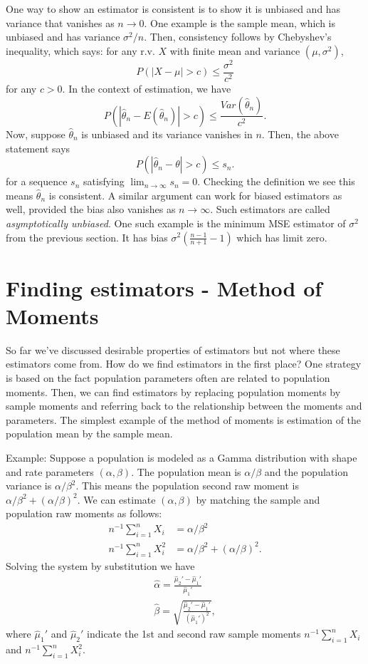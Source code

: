 \documentclass[
]{book}
\begin{document}
One way to show an estimator is consistent is to show it is unbiased and has variance that vanishes as \(n\rightarrow 0\). One example is the sample mean, which is unbiased and has variance \(\sigma^2/n\). Then, consistency follows by Chebyshev's inequality, which says: for any r.v. \(X\) with finite mean and variance \((\mu, \sigma^2)\),
\[P(|X - \mu|>c)\leq \frac{\sigma^2}{c^2}\]
for any \(c>0\). In the context of estimation, we have
\[P(|\hat\theta_n - E(\hat\theta_n)|>c) \leq \frac{Var(\hat\theta_n)}{c^2}.\]
Now, suppose \(\hat\theta_n\) is unbiased and its variance vanishes in \(n\). Then, the above statement says
\[P(|\hat\theta_n - \theta|>c) \leq s_n.\]
for a sequence \(s_n\) satisfying \(\lim_{n\rightarrow \infty} s_n = 0\). Checking the definition we see this means \(\hat\theta_n\) is consistent. A similar argument can work for biased estimators as well, provided the bias also vanishes as \(n\rightarrow\infty\). Such estimators are called \emph{asymptotically unbiased}. One such example is the minimum MSE estimator of \(\sigma^2\) from the previous section. It has bias \(\sigma^2(\frac{n-1}{n+1}-1)\) which has limit zero.

\hypertarget{finding-estimators---method-of-moments}{%
\section{Finding estimators - Method of Moments}\label{finding-estimators---method-of-moments}}

So far we've discussed desirable properties of estimators but not where these estimators come from. How do we find estimators in the first place? One strategy is based on the fact population parameters often are related to population moments. Then, we can find estimators by replacing population moments by sample moments and referring back to the relationship between the moments and parameters. The simplest example of the method of moments is estimation of the population mean by the sample mean.

Example: Suppose a population is modeled as a Gamma distribution with shape and rate parameters \((\alpha, \beta)\). The population mean is \(\alpha / \beta\) and the population variance is \(\alpha / \beta^2\). This means the population second raw moment is \(\alpha / \beta^2 + (\alpha / \beta)^2\). We can estimate \((\alpha, \beta)\) by matching the sample and population raw moments as follows:
\begin{align*}
n^{-1}\sum_{i=1}^n X_i &= \alpha/\beta^2\\
n^{-1}\sum_{i=1}^n X_i^2 &= \alpha/\beta^2 + (\alpha / \beta)^2.
\end{align*}
Solving the system by substitution we have
\begin{align*}
\hat\alpha = \frac{\hat\mu_2' - \hat\mu_1'}{\hat\mu_1'}\\
\hat \beta = \sqrt{\frac{\hat\mu_2' - \hat\mu_1'}{(\hat\mu_1')^2}},
\end{align*}
where \(\hat\mu_1'\) and \(\hat\mu_2'\) indicate the 1st and second raw sample moments \(n^{-1}\sum_{i=1}^n X_i\) and \(n^{-1}\sum_{i=1}^n X_i^2\).
\end{document}
